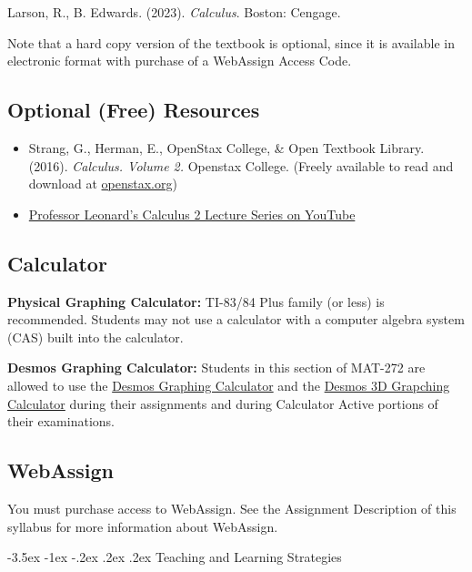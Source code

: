 \documentclass[11pt]{article}
\makeatletter
\renewcommand\section{\@startsection{section}{1}{0pt}%
  {-3.5ex \@plus -1ex \@minus -.2ex}%
  {.2ex \@plus.2ex}%
  {\normalfont\Large\bfseries}} %
\makeatother
\begin{document}
Larson, R., B. Edwards. (2023). \textit{Calculus}. Boston: Cengage.

Note that a hard copy version of the textbook is optional, since it is available in electronic format with purchase of a WebAssign Access Code.

\subsection{Optional (Free) Resources}

\begin{itemize}
\item Strang, G., Herman, E., OpenStax College, \& Open Textbook Library. (2016). \textit{Calculus. Volume 2.} Openstax College. (Freely available to read and download at \href{https://openstax.org/details/books/calculus-volume-2}{openstax.org})


\item \href{https://www.youtube.com/watch?v=H9eCT6f\_Ftw\&list=PLDesaqWTN6EQ2J4vgsN1HyBeRADEh4Cw-\&index=1}{Professor Leonard's Calculus 2 Lecture Series on YouTube}
\end{itemize}

\subsection{Calculator}

\textbf{Physical Graphing Calculator:} TI-83/84 Plus family (or less) is recommended. Students may not use a calculator with a computer algebra system (CAS) built into the calculator.

\textbf{Desmos Graphing Calculator:} Students in this section of MAT-272 are allowed to use the \href{https://www.desmos.com/calculator}{Desmos Graphing Calculator} and the \href{http://www.desmos.com/3d}{Desmos 3D Grapching Calculator} during their assignments and during Calculator Active portions of their examinations.

\subsection{WebAssign}

You must purchase access to WebAssign. See the Assignment Description of this syllabus for more information about WebAssign.

\section{Teaching and Learning Strategies}
\end{document}
